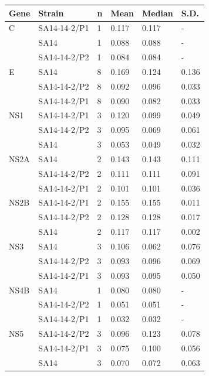 \begin{tabu}{X[l]X[1.5,l]X[l]X[l]X[l]X[l]}
	\rowfont[1]{\bfseries}
\toprule
Gene & Strain       & n & Mean  & Median & S.D.  \\ \midrule
C    & SA14-14-2/P1 & 1 & 0.117 & 0.117 & -     \\
& SA14         & 1 & 0.088 & 0.088 & -     \\
& SA14-14-2/P2 & 1 & 0.084 & 0.084 & -     \\ \midrule
E    & SA14         & 8 & 0.169 & 0.124 & 0.136 \\
& SA14-14-2/P2 & 8 & 0.092 & 0.096 & 0.033 \\
& SA14-14-2/P1 & 8 & 0.090 & 0.082 & 0.033 \\ \midrule
NS1  & SA14-14-2/P1 & 3 & 0.120 & 0.099 & 0.049 \\
& SA14-14-2/P2 & 3 & 0.095 & 0.069 & 0.061 \\
& SA14         & 3 & 0.053 & 0.049 & 0.032 \\ \midrule
NS2A & SA14         & 2 & 0.143 & 0.143 & 0.111 \\
& SA14-14-2/P2 & 2 & 0.111 & 0.111 & 0.091 \\
& SA14-14-2/P1 & 2 & 0.101 & 0.101 & 0.036 \\ \midrule
NS2B & SA14-14-2/P1 & 2 & 0.155 & 0.155 & 0.011 \\
& SA14-14-2/P2 & 2 & 0.128 & 0.128 & 0.017 \\
& SA14         & 2 & 0.117 & 0.117 & 0.002 \\ \midrule
NS3  & SA14         & 3 & 0.106 & 0.062 & 0.076 \\
& SA14-14-2/P2 & 3 & 0.093 & 0.096 & 0.069 \\
& SA14-14-2/P1 & 3 & 0.093 & 0.095 & 0.050 \\ \midrule
NS4B & SA14         & 1 & 0.080 & 0.080 & -     \\
& SA14-14-2/P2 & 1 & 0.051 & 0.051 & -     \\
& SA14-14-2/P1 & 1 & 0.032 & 0.032 & -     \\ \midrule
NS5  & SA14-14-2/P2 & 3 & 0.096 & 0.123 & 0.078 \\
& SA14-14-2/P1 & 3 & 0.075 & 0.100 & 0.056 \\
& SA14         & 3 & 0.070 & 0.072 & 0.063 \\ \bottomrule
\end{tabu}